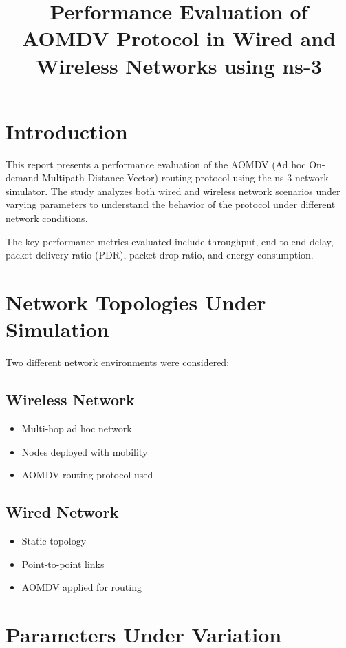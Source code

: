 \documentclass[11pt]{article}
\title{\textbf{Performance Evaluation of AOMDV Protocol in Wired and Wireless Networks using ns-3}}
\author{}
\date{}
\begin{document}
\maketitle

\section{Introduction}

This report presents a performance evaluation of the AOMDV (Ad hoc On-demand Multipath Distance Vector) routing protocol using the ns-3 network simulator. The study analyzes both wired and wireless network scenarios under varying parameters to understand the behavior of the protocol under different network conditions.

The key performance metrics evaluated include throughput, end-to-end delay, packet delivery ratio (PDR), packet drop ratio, and energy consumption.

\section{Network Topologies Under Simulation}

Two different network environments were considered:

\subsection{Wireless Network}
\begin{itemize}
    \item Multi-hop ad hoc network
    \item Nodes deployed with mobility
    \item AOMDV routing protocol used
\end{itemize}

\subsection{Wired Network}
\begin{itemize}
    \item Static topology
    \item Point-to-point links
    \item AOMDV applied for routing
\end{itemize}

\section{Parameters Under Variation}
\end{document}
